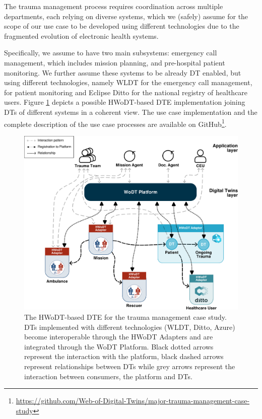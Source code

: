 The trauma management process requires coordination across multiple departments, each relying on diverse systems, which we (safely) assume for the scope of our use case to be developed using different technologies due to the fragmented evolution of electronic health systems.

Specifically, we assume to have two main subsystems: emergency call management, which includes mission planning, and pre-hospital patient monitoring.
%
We further assume these systems to be already \ac{DT} enabled, but using different technologies, namely \ac{WLDT} for the emergency call management, \azureTwin{} for patient monitoring and Eclipse Ditto for the national registry of healthcare users.
%
Figure \ref{fig:use-case-diagram} depicts a possible \ac{HWoDT}-based \ac{DTE} implementation joining \acp{DT} of different systems in a coherent view.
%
The use case implementation and the complete description of the use case processes are available on GitHub\footnote{\url{https://github.com/Web-of-Digital-Twins/major-trauma-management-case-study}}.


\begin{figure}[t]
  \centering
  \includegraphics[width=\columnwidth]{figures/hwodt/major-trauma-management.pdf}
  \caption{The \ac{HWoDT}-based \ac{DTE} for the trauma management case study. \acp{DT} implemented with different technologies (WLDT, Ditto, Azure) become interoperable through the HWoDT Adapters and are integrated through the WoDT Platform. 
  Black dotted arrows represent the interaction with the platform, black dashed arrows represent relationships between \acp{DT} while grey arrows represent the interaction between consumers, the platform and \acp{DT}.
  }
  \label{fig:use-case-diagram}
\end{figure}


